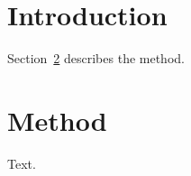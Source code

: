 \documentclass{article}
\begin{document}
\section{Introduction}\label{sec:intro}
Section~\ref{sec:method} describes the method.
\section{Method}\label{sec:method}
Text.
\end{document}
